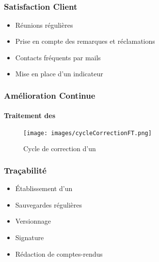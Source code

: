 \subsection{} %

\begin{frame}
\frametitle{Satisfaction Client}
	\begin{itemize}
		\item Réunions régulières
		\item Prise en compte des remarques et réclamations
		\item Contacts fréquents par mails
		\item Mise en place d'un indicateur
	\end{itemize}
\end{frame}

\begin{frame}
\frametitle{Amélioration Continue}
\framesubtitle{Traitement des \FT{}}
\begin{center}
\begin{figure}
\texttt{[image: images/cycleCorrectionFT.png]}
\caption{Cycle de correction d'un \FT{}}
\end{figure}
\end{center}
\end{frame}


\begin{frame}
\frametitle{Traçabilité}
	\begin{itemize}
		\item Établissement d'un \PGC{}
		\item Sauvegardes régulières
		\item Versionnage
		\item Signature
		\item Rédaction de comptes-rendus
	\end{itemize}
\end{frame}